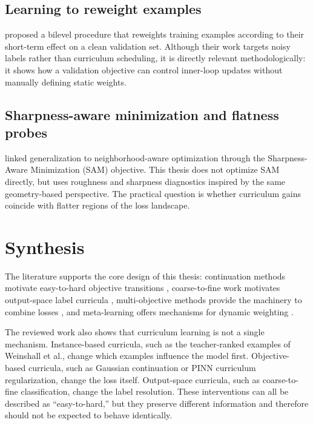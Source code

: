 \documentclass[english,master,a4paper,oneside]{ppfcmthesis}
\begin{document}
\subsection{Learning to reweight examples}
\citet{renLearningReweightExamples2018a} proposed a bilevel procedure
that reweights training examples according to their short-term effect on a clean
validation set. Although their work targets noisy labels rather than curriculum
scheduling, it is directly relevant methodologically: it shows how a validation
objective can control inner-loop updates without manually defining static
weights.

\subsection{Sharpness-aware minimization and flatness probes}
\citet{foretSharpnessAwareMinimizationEfficiently2021} linked
generalization to neighborhood-aware optimization through the
Sharpness-Aware Minimization (SAM) objective. This thesis does not optimize SAM
directly, but uses roughness and sharpness diagnostics inspired by the same
geometry-based perspective. The practical question is whether curriculum gains
coincide with flatter regions of the loss landscape.

\section{Synthesis}

The literature supports the core design of this thesis: continuation methods
motivate easy-to-hard objective transitions
\citep{allgower1990numerical,mobahi2015theoretical,ilersich2025deep},
coarse-to-fine work motivates output-space label curricula
\citep{stretcuCoarsetoFineCurriculumLearning2021}, multi-objective methods
provide the machinery to combine losses \citep{chen2024gradient}, and
meta-learning offers mechanisms for dynamic weighting
\citep{son2024meta,mao2022metaweighting}.

The reviewed work also shows that curriculum learning is not a single mechanism.
Instance-based curricula, such as the teacher-ranked examples of Weinshall et
al., change which examples influence the model first. Objective-based curricula,
such as Gaussian continuation or PINN curriculum regularization, change the
loss itself. Output-space curricula, such as coarse-to-fine classification,
change the label resolution. These interventions can all be described as
``easy-to-hard,'' but they preserve different information and therefore should
not be expected to behave identically.
\end{document}
